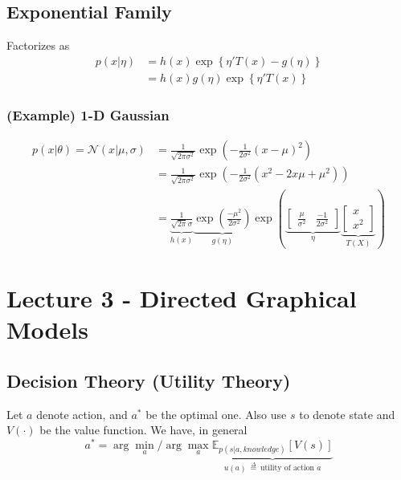 \documentclass[11pt]{article}
\newcommand{\argmax}{\arg\max}
\begin{document}
\subsection{Exponential Family}
Factorizes as
\begin{align}
    p(x | \eta) 
    &=h(x) \exp \left\{\eta' T(x)-g(\eta)\right\} \\
    &=h(x) g(\eta) \exp \left\{\eta' T(x)\right\}
\end{align}
\subsubsection{(Example) 1-D Gaussian}
\begin{align}
    p(x|\theta) = \mathcal{N}(x|\mu, \sigma)
    &= \frac{1}{\sqrt{2\pi \sigma^2}}\exp \left(- \frac{1}{2\sigma^2} (x - \mu)^2 \right) \\
    &= \frac{1}{\sqrt{2\pi \sigma^2}}\exp \left(- \frac{1}{2\sigma^2} (x^2 - 2x\mu + \mu^2) \right) \\
    &= 
        \underbrace{\frac{1}{\sqrt{2\pi}\sigma}}_{h(x)} 
        \underbrace{\exp\left( \frac{-\mu^2}{2\sigma^2} \right)}_{g(\eta)}
    \exp\left(
    \underbrace{
        \begin{bmatrix}
            \frac{\mu}{\sigma^2} 
            & \frac{-1}{2\sigma^2}
        \end{bmatrix}}_{\eta}
    \underbrace{
        \begin{bmatrix}
            x \\
            x^2
        \end{bmatrix}}_{T(X)}
    \right)
\end{align}



\section{Lecture 3 - Directed Graphical Models}
\subsection{Decision Theory (Utility Theory)}
Let $a$ denote action, and $a^*$ be the optimal one. Also use $s$ to denote state and $V(\cdot)$ be the value function. We have, in general
\begin{equation}
    a^* = \arg\min_a/\argmax_a \underbrace{{\mathbb{E}}_{p(s\vert a, knowledge)}\left[V(s)\right]}_{u(a)~ \overset{\Delta}{=} ~\text{utility of action $a$}}
\end{equation}
\end{document}
